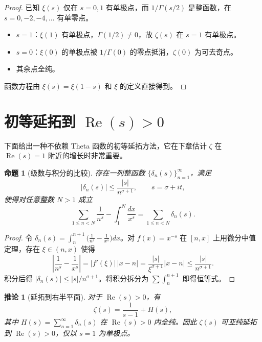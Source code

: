 \documentclass[UTF8]{ctexart}
\newtheorem{proposition}[theorem]{命题}
\newtheorem{corollary}[theorem]{推论}
\numberwithin{equation}{section}
\begin{document}
\begin{proof}
已知 $\xi(s)$ 仅在 $s=0,1$ 有单极点，而 $1/\Gamma(s/2)$ 是整函数，在 $s=0,-2,-4,\dots$ 有单零点。
\begin{itemize}
\item $s=1$：$\xi(1)$ 有单极点，$\Gamma(1/2)\neq0$，故 $\zeta(s)$ 在 $s=1$ 有单极点。
\item $s=0$：$\xi(0)$ 的单极点被 $1/\Gamma(0)$ 的零点抵消，$\zeta(0)$ 为可去奇点。
\item 其余点全纯。
\end{itemize}
函数方程由 $\xi(s)=\xi(1-s)$ 和 $\xi$ 的定义直接得到。
\end{proof}

\section{初等延拓到 $\operatorname{Re}(s)>0$}

下面给出一种不依赖 Theta 函数的初等延拓方法，它在下章估计 $\zeta$ 在 $\operatorname{Re}(s)=1$ 附近的增长时非常重要。

\begin{proposition}[级数与积分的比较]\label{prop:Delta}
存在一列整函数 $\{\delta_n(s)\}_{n=1}^{\infty}$，满足
\[
|\delta_n(s)| \le \frac{|s|}{n^{\sigma+1}}, \qquad s=\sigma+it,
\]
使得对任意整数 $N>1$ 成立
\begin{equation}\label{eq:DeltaId}
\sum_{1\le n < N} \frac{1}{n^{s}} - \int_{1}^{N} \frac{dx}{x^{s}}
= \sum_{1\le n < N} \delta_n(s).
\end{equation}
\end{proposition}

\begin{proof}
令 $\delta_n(s) = \int_{n}^{n+1} \bigl( \frac{1}{n^{s}} - \frac{1}{x^{s}} \bigr) dx$。对 $f(x)=x^{-s}$ 在 $[n,x]$ 上用微分中值定理，存在 $\xi\in(n,x)$ 使得
\[
\left|\frac{1}{n^{s}} - \frac{1}{x^{s}}\right|
= |f'(\xi)|\,|x-n|
= \frac{|s|}{\xi^{\sigma+1}} |x-n|
\le \frac{|s|}{n^{\sigma+1}}.
\]
积分后得 $|\delta_n(s)|\le |s|/n^{\sigma+1}$。将积分拆分为 $\sum \int_{n}^{n+1}$ 即得恒等式。
\end{proof}

\begin{corollary}[延拓到右半平面]\label{cor:ZetaHalf}
对于 $\operatorname{Re}(s)>0$，有
\[
\zeta(s) = \frac{1}{s-1} + H(s),
\]
其中 $H(s) = \sum_{n=1}^{\infty} \delta_n(s)$ 在 $\operatorname{Re}(s)>0$ 内全纯。因此 $\zeta(s)$ 可亚纯延拓到 $\operatorname{Re}(s)>0$，仅以 $s=1$ 为单极点。
\end{corollary}
\end{document}

